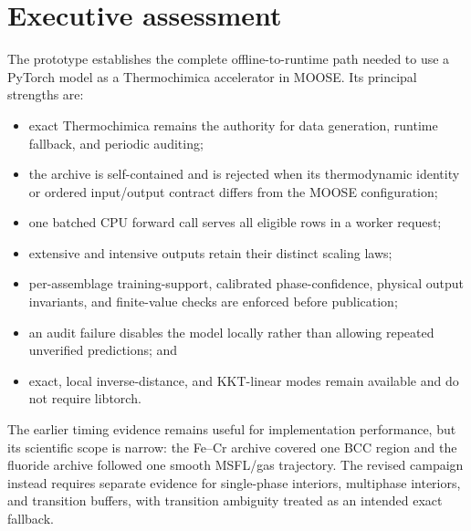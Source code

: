 \documentclass[11pt]{article}
\begin{document}
\tableofcontents

\section{Executive assessment}

The prototype establishes the complete offline-to-runtime path needed to use a PyTorch model as a
Thermochimica accelerator in MOOSE.  Its principal strengths are:
\begin{itemize}[leftmargin=*]
  \item exact Thermochimica remains the authority for data generation, runtime fallback, and
  periodic auditing;
  \item the archive is self-contained and is rejected when its thermodynamic identity or ordered
  input/output contract differs from the MOOSE configuration;
  \item one batched CPU forward call serves all eligible rows in a worker request;
  \item extensive and intensive outputs retain their distinct scaling laws;
  \item per-assemblage training-support, calibrated phase-confidence, physical output invariants,
  and finite-value checks are enforced before publication;
  \item an audit failure disables the model locally rather than allowing repeated unverified
  predictions; and
  \item exact, local inverse-distance, and KKT-linear modes remain available and do not require
  libtorch.
\end{itemize}

The earlier timing evidence remains useful for implementation performance, but its scientific
scope is narrow: the Fe--Cr archive covered one BCC region and the fluoride archive followed one
smooth MSFL/gas trajectory.  The revised campaign instead requires separate evidence for
single-phase interiors, multiphase interiors, and transition buffers, with transition ambiguity
treated as an intended exact fallback.
\end{document}
